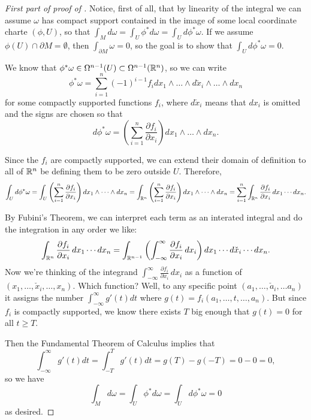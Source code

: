 \begin{proof}[{First part of proof of }]
	Notice, first of all, that by linearity of the integral we can assume $\omega$ has compact support contained in the image of some local coordinate charte $(\phi,U)$, so that $\int_M d\omega = \int_U \phi^\ast d\omega = \int_U d\phi^\ast \omega$. If we assume $\phi(U) \cap \partial M = \emptyset$, then $\int_{\partial M} \omega = 0$, so the goal is to show that $\int_U d\phi^\ast \omega = 0$.
	
	We know that $\phi^\ast \omega \in \Omega^{n-1}(U) \subset \Omega^{n-1}(\mathbb{R}^n)$, so we can write
	\[
		\phi^\ast \omega = \sum_{i=1}^n (-1)^{i-1} f_i dx_1 \wedge \dots \wedge d\check{x}_i \wedge \dots \wedge dx_n
	\]
	for some compactly supported functions $f_i$, where $d\check{x}_i$ means that $dx_i$ is omitted and the signs are chosen so that
	\[
		d\phi^\ast \omega = \left(\sum_{i=1}^n \frac{\partial f_i}{\partial x_i} \right) dx_1 \wedge \dots \wedge dx_n.
	\]
	
	Since the $f_i$ are compactly supported, we can extend their domain of definition to all of $\mathbb{R}^n$ be defining them to be zero outside $U$. Therefore,
	\[
		\int_U d\phi^\ast \omega = \int_U \left(\sum_{i=1}^n \frac{\partial f_i}{\partial x_i} \right) dx_1 \wedge \dots \wedge dx_n = \int_{\mathbb{R}^n} \left(\sum_{i=1}^n \frac{\partial f_i}{\partial x_i} \right) dx_1 \wedge \dots \wedge dx_n = \sum_{i=1}^n\int_{\mathbb{R}^n} \frac{\partial f_i}{\partial x_i}\,  dx_1 \cdots dx_n.
	\]
	
	By Fubini's Theorem, we can interpret each term as an interated integral and do the integration in any order we like:
	\[
		\int_{\mathbb{R}^n} \frac{\partial f_i}{\partial x_i} \, dx_1 \cdots dx_n = \int_{\mathbb{R}^{n-1}} \left(\int_{-\infty}^\infty \frac{\partial f_i}{\partial x_i} \, dx_i\right) dx_1 \cdots d\check{x}_i \cdots dx_n.
	\]
	Now we're thinking of the integrand $\int_{-\infty}^\infty \frac{\partial f_i}{\partial x_i} \, dx_i$ as a function of $(x_1, \dots , \check{x}_i, \dots , x_n)$. Which function? Well, to any specific point $(a_1, \dots, \check{a}_i, \dots a_n)$ it assigns the number $\int_{-\infty}^\infty g'(t)dt$ where $g(t) = f_i(a_1, \dots , t, \dots , a_n)$. But since $f_i$ is compactly supported, we know there exists $T$ big enough that $g(t) = 0$ for all $t \geq T$. 
	
	Then the Fundamental Theorem of Calculus implies that
	\[
		\int_{-\infty}^\infty g'(t) dt = \int_{-T}^T g'(t)dt = g(T) - g(-T) = 0-0=0,
	\]
	so we have
	\[
		\int_M d\omega = \int_U \phi^\ast d\omega = \int_U d\phi^\ast \omega = 0
	\]
	as desired.
\end{proof}

